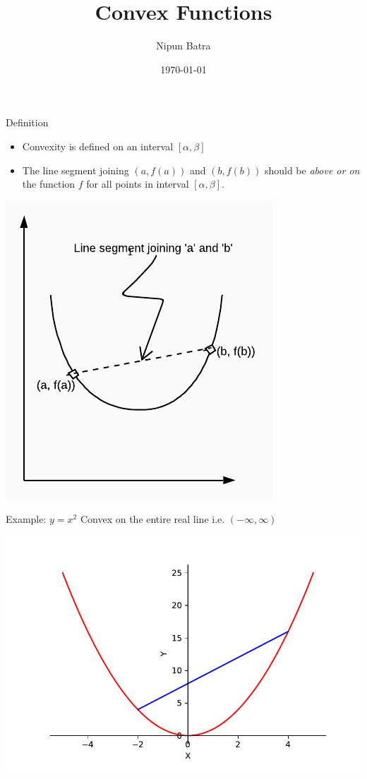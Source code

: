 \documentclass{beamer}
\title{Convex Functions}
\date{\today}
\author{Nipun Batra}
\institute{IIT Gandhinagar}
\begin{document}
	\maketitle

	\begin{frame}{Definition}
	\begin{itemize}
\item Convexity is defined on an interval $[\alpha,\beta]$
	\item The line segment joining $(a,f(a))$ and $(b, f(b))$ should be \textit{above or on} the function $f$ for all points in interval $[\alpha,\beta]$.
	\end{itemize}
	\begin{center}
	\includegraphics[scale=0.8]{fig1}
	\end{center}
	\end{frame}
	
	\begin{frame}{Example: $y = x^2$}
	Convex on the entire real line i.e. $(-\infty, \infty)$
	\begin{center}
	\includegraphics[scale=0.5]{y-x2}
	\end{center}
	\end{frame}
\end{document}
